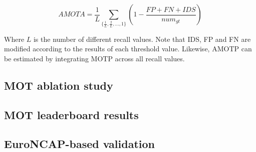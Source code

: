 \begin{equation}
	\label{eq:5_amota}
	AMOTA = \frac{1}{L}\sum_{\{\frac{1}{L},\frac{2}{L},...,1\}}(1-\frac{FP+FN+IDS}{num_{gt}})
\end{equation}

Where $L$ is the number of different recall values. Note that IDS, FP and FN are modified according to the results of each threshold value. Likewise, AMOTP can be estimated by integrating MOTP across all recall values.

\subsection{MOT ablation study}
\label{subsec:5_mot_ablation}

\subsection{MOT leaderboard results}
\label{subsec:5_mot_}

\subsection{EuroNCAP-based validation}
\label{sec:5_euroncap}

